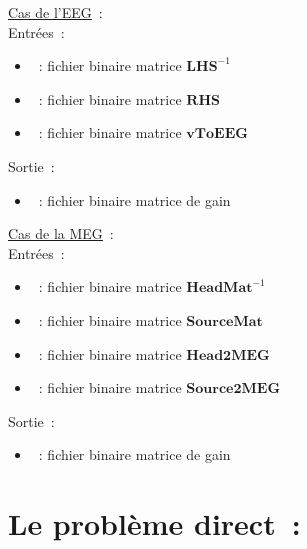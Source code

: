 \checkItem \underline{Cas de l'EEG}~:\\
Entrées~:
\begin{itemize}
    \item {}~: fichier binaire matrice $\mathbf{LHS}^{-1}$
    \item {}~: fichier binaire matrice $\mathbf{RHS}$
    \item {}~: fichier binaire matrice $\mathbf{vToEEG}$
\end{itemize}
Sortie~:
\begin{itemize}
    \item {}~: fichier binaire matrice de gain
\end{itemize}

\medskip

\noindent
{}


\bigskip

\checkItem\underline{Cas de la MEG}~:\\
Entrées~:
\begin{itemize}
    \item {}~: fichier binaire matrice $\mathbf{HeadMat}^{-1}$
    \item {}~: fichier binaire matrice $\mathbf{SourceMat}$
    \item {}~: fichier binaire matrice $\mathbf{Head2MEG}$
    \item {}~: fichier binaire matrice $\mathbf{Source2MEG}$
\end{itemize}
Sortie~:
\begin{itemize}
    \item {}~: fichier binaire matrice de gain
\end{itemize}

\medskip

\noindent
{}


\section{Le problème direct~:}
\label{sect: command direct}

